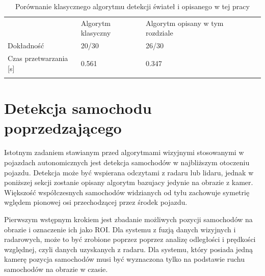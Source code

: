 \begin{table}[]
\centering
\caption{Porównanie klasycznego algorytmu detekcji świateł i opisanego w tej pracy\cite{T4}}
\begin{tabular}{lllll}
\cline{1-3}
\multicolumn{1}{|l|}{}                           & \multicolumn{1}{l|}{Algorytm klasyczny} & \multicolumn{1}{l|}{Algorytm opisany w tym rozdziale} &  &  \\ \cline{1-3}
\multicolumn{1}{|l|}{Dokładność}                 & \multicolumn{1}{l|}{20/30}              & \multicolumn{1}{l|}{26/30}                            &  &  \\ \cline{1-3}
\multicolumn{1}{|l|}{Czas przetwarzania {[}s{]}} & \multicolumn{1}{l|}{0.561}              & \multicolumn{1}{l|}{0.347}                            &  &  \\ \cline{1-3}
                                                 &                                         &                                                       &  & 
\end{tabular}
\label{tab:tl_results}
\end{table}



\section{Detekcja samochodu poprzedzającego}
\label{sec:car_general}
Istotnym zadaniem stawianym przed algorytmami wizyjnymi stosowanymi w pojazdach autonomicznych jest detekcja samochodów w najbliższym otoczeniu pojazdu. Detekcja może być wspierana odczytami z radaru lub lidaru, jednak w poniższej sekcji zostanie opisany algorytm bazujacy jedynie na obrazie z kamer. Większość współczesnych samochodów widzianych od tyłu zachowuje symetrię wględem pionowej osi przechodzącej przez środek pojazdu. 

Pierwszym wstępnym krokiem jest zbadanie możliwych pozycji samochodów na obrazie i oznaczenie ich jako ROI. Dla systemu z fuzją danych wizyjnych i radarowych, może to być zrobione poprzez poprzez analizę odległości i prędkości względnej, czyli danych uzyskanych z radaru. Dla systemu, który posiada jedną kamerę pozycja samochodów musi być wyznaczona tylko na podstawie ruchu samochodów na obrazie w czasie.

